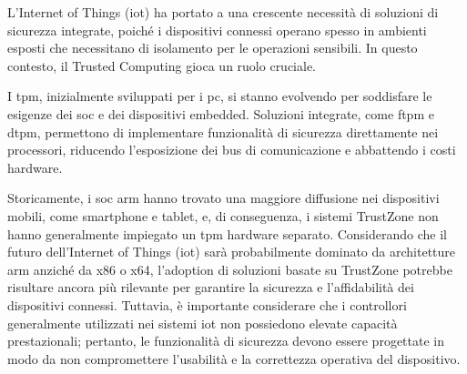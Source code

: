 L’Internet of Things (\acrshort{iot}) ha portato a una crescente necessità di soluzioni di sicurezza integrate, poiché i dispositivi connessi operano spesso in ambienti esposti che necessitano di isolamento per le operazioni sensibili. In questo contesto, il Trusted Computing gioca un ruolo cruciale.

I \acrshort{tpm}, inizialmente sviluppati per i \acrshort{pc}, si stanno evolvendo per soddisfare le esigenze dei \acrshort{soc} e dei dispositivi embedded. Soluzioni integrate, come \acrshort{ftpm} e \acrshort{dtpm}, permettono di implementare funzionalità di sicurezza direttamente nei processori, riducendo l'esposizione dei bus di comunicazione e abbattendo i costi hardware.

Storicamente, i \acrshort{soc} \acrshort{arm} hanno trovato una maggiore diffusione nei dispositivi mobili, come smartphone e tablet, e, di conseguenza, i sistemi TrustZone non hanno generalmente impiegato un \acrshort{tpm} hardware separato. Considerando che il futuro dell'Internet of Things (\acrshort{iot}) sarà probabilmente dominato da architetture \acrshort{arm} anziché da x86 o x64, l'adoption di soluzioni basate su TrustZone potrebbe risultare ancora più rilevante per garantire la sicurezza e l'affidabilità dei dispositivi connessi. Tuttavia, è importante considerare che i controllori generalmente utilizzati nei sistemi \acrshort{iot} non possiedono elevate capacità prestazionali; pertanto, le funzionalità di sicurezza devono essere progettate in modo da non compromettere l'usabilità e la correttezza operativa del dispositivo.